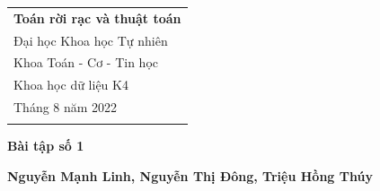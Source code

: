\documentclass[a4paper,12pt]{article} %
\begin{document}



\thispagestyle{empty} %

\begin{tabular}{p{15.5cm}} %
{\large \bf Toán rời rạc và thuật toán} \\
Đại học Khoa học Tự nhiên \\
Khoa Toán - Cơ - Tin học \\ 
Khoa học dữ liệu K4 \\
Tháng 8 năm 2022  \\ 
\hline %
\\
\end{tabular} %

\vspace*{0.3cm} %

\begin{center} %
	{\Large \bf Bài tập số 1} %
	\vspace{2mm}
	
	{\bf Nguyễn Mạnh Linh, Nguyễn Thị Đông, Triệu Hồng Thúy} %
		
\end{center}  

\vspace{0.4cm}






\end{document}
